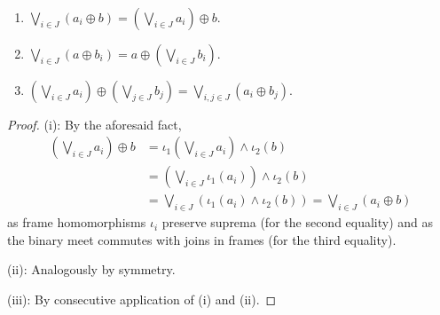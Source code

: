 \begin{lem} \label{oplus-vee-distrib}
  ~
  \begin{enumerate}
  \item $\bigvee_{i\in J} \left(a_i \oplus b\right) = \left(\bigvee_{i\in J}
    a_i \right) \oplus b$.
  \item $\bigvee_{i\in J} \left(a \oplus b_i\right) = a \oplus
    \left(\bigvee_{i\in J} b_i \right)$.
  \item $\left(\bigvee_{i\in J} a_i\right) \oplus \left(\bigvee_{j\in J}
    b_j\right) = \bigvee_{i, j\in J} \left(a_i \oplus b_j\right)$.
  \end{enumerate}
\end{lem}
\begin{proof}
  (i):
  By the aforesaid fact,
  \begin{align*}
    \left(\bigvee_{i\in J} a_i \right) \oplus b
    &= \iota_1\left(\bigvee_{i\in J} a_i \right) \wedge \iota_2(b) \\
    &= \left(\bigvee_{i\in J} \iota_1(a_i) \right) \wedge \iota_2(b) \\
    &= \bigvee_{i\in J} \left(\iota_1(a_i) \wedge \iota_2(b) \right)
    = \bigvee_{i\in J} \left(a_i \oplus b\right)
  \end{align*}
  as frame homomorphisms $\iota_i$ preserve suprema (for the second equality)
  and as the binary meet commutes with joins in frames (for the third
  equality).

  (ii):
  Analogously by symmetry.

  (iii):
  By consecutive application of (i) and (ii).
\end{proof}

